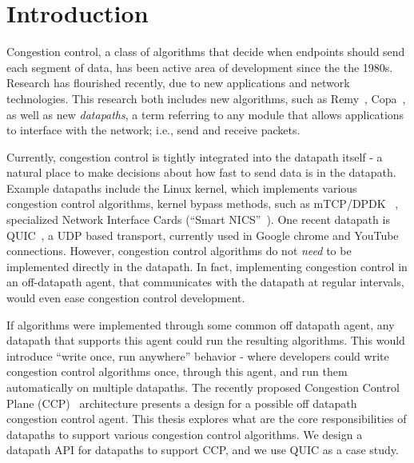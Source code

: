 \chapter{Introduction}
Congestion control, a class of algorithms that decide when endpoints should send each segment of data, has been active area of development since the the 1980s.
Research has flourished recently, due to new applications and network technologies.
This research both includes new algorithms, such as Remy~\cite{remy}, Copa~\cite{copa}, as well as new \textit{datapaths}, a term referring to any module that allows applications to interface with the network; i.e., send and receive packets.

\par Currently, congestion control is tightly integrated into the datapath itself - a natural place to make decisions about how fast to send data is in the datapath.
Example datapaths include the Linux kernel, which implements various congestion control algorithms, kernel bypass methods, such as mTCP/DPDK ~\cite{dpdk,mtcp,netmap}, specialized Network Interface Cards (``Smart NICS''~\cite{smartnic}).
One recent datapath is QUIC~\cite{quic}, a UDP based transport, currently used in Google chrome and YouTube connections.
However, congestion control algorithms do not \textit{need} to be implemented directly in the datapath.
In fact, implementing congestion control in an off-datapath agent, that communicates with the datapath at regular intervals, would even ease congestion control development.

\par If algorithms were implemented through some common off datapath agent, any datapath that supports this agent could run the resulting algorithms.
This would introduce ``write once, run anywhere'' behavior - where developers could write congestion control algorithms once, through this agent, and run them automatically on multiple datapaths.
The recently proposed Congestion Control Plane (CCP)~\cite{ccp} architecture presents a design for a possible off datapath congestion control agent.
This thesis explores what are the core responsibilities of datapaths to support various congestion control algorithms.
We design a datapath API for datapaths to support CCP, and we use QUIC as a case study.

